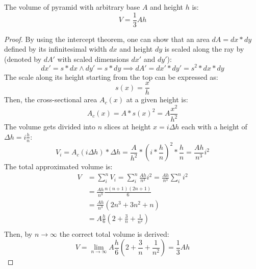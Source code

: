\begin{theorem}
    The volume of pyramid with arbitrary base $A$ and height $h$ is:
    \begin{equation}
        V = \frac{1}{3}Ah
    \end{equation}
\end{theorem}
\begin{proof}
    By using the intercept theorem, one can show that an area $dA=dx * dy$ defined 
    by its infinitesimal width $dx$ and height $dy$ is scaled along the ray by 
    (denoted by $dA'$ with scaled dimensions $dx'$ and $dy'$):
    \begin{equation}
        dx' = s * dx \land dy' = s * dy \implies dA' = dx' * dy' = s^2 * dx * dy
    \end{equation}
    The scale along its height starting from the top can be expressed as:
    \begin{equation}
        s(x) = \frac{x}{h}
    \end{equation}
    Then, the cross-sectional area $A_c(x)$ at a given height is:
    \begin{equation}
        A_c(x) = A * s(x)^2 = A \frac{x^2}{h^2}
    \end{equation}
    The volume gets divided into $n$ slices at height $x = i \Delta h$ 
    each with a height of $\Delta h=i\frac{h}{n}$:
    \begin{equation}
        V_i = A_c(i \Delta h) * \Delta h 
            = \frac{A}{h^2} * \left(i * \frac{h}{n}\right)^2 * \frac{h}{n} 
            = \frac{A h}{n^3} i^2
    \end{equation}
    The total approximated volume is:
    \begin{equation}
        \begin{split}
            V & = \sum_{i}^{n}V_i 
                = \sum_{i}^{n}\frac{A h}{n^3} i^2
                =  \frac{A h}{n^3} \sum_{i}^{n}i^2 \\
              & =  \frac{A h}{n^3} \frac{n(n+1)(2n+1)}{6} \\
              & =  \frac{A h}{n^3} (2n^3+3n^2+n) \\
              & =  A\frac{h}{6} (2+\frac{3}{n}+\frac{1}{n^2}) \\
        \end{split}
    \end{equation}
    Then, by $n \rightarrow \infty$ the correct total volume is derived:
    \begin{equation}
        V = \lim_{n \rightarrow \infty}A\frac{h}{6} (2+\frac{3}{n}+\frac{1}{n^2}) = \frac{1}{3}Ah
    \end{equation}
\end{proof}


